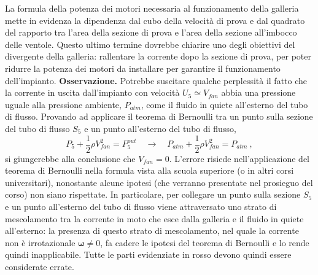 La formula della potenza dei motori necessaria al funzionamento della galleria mette in evidenza la dipendenza dal cubo della velocità di prova e dal quadrato del rapporto tra l'area della sezione di prova e l'area della sezione all'imbocco delle ventole. Questo ultimo termine dovrebbe chiarire uno degli obiettivi del divergente della galleria: rallentare la corrente dopo la sezione di prova, per poter ridurre la potenza dei motori da installare per garantire il funzionamento dell'impianto.
%
\newline \noindent
\textbf{Osservazione.} Potrebbe suscitare qualche perplessità il fatto che la corrente in uscita dall'impianto con velocità $U_5 \simeq V_{fan}$ abbia una pressione uguale alla pressione ambiente, $P_{atm}$, come il fluido in quiete all'esterno del tubo di flusso. {\color{red} Provando ad applicare il teorema di Bernoulli} tra un punto sulla sezione del tubo di flusso $S_5$ e un punto all'esterno del tubo di flusso,
{\color{red}
\begin{equation}
 P_5 + \dfrac{1}{2}\rho V_{fan}^2 = P_5^{out}
 \quad \rightarrow \quad 
 P_{atm} + \dfrac{1}{2}\rho V_{fan}^2 = P_{atm} \ ,
\end{equation}
}
si giungerebbe alla conclusione che {\color{red} $V_{fan} = 0$}. L'errore risiede nell'applicazione del teorema di Bernoulli nella formula vista alla scuola superiore (o in altri corsi universitari), nonostante alcune ipotesi (che verranno presentate nel prosieguo del corso) non siano rispettate. In particolare, per collegare un punto sulla sezione $S_5$ e un punto all'esterno del tubo di flusso viene attraversato uno strato di mescolamento tra la corrente in moto che esce dalla galleria e il fluido in quiete all'esterno: la presenza di questo strato di mescolamento, nel quale la corrente non è irrotazionale $\bm{\omega} \neq 0$, fa cadere le ipotesi del teorema di Bernoulli e lo rende quindi inapplicabile. Tutte {\color{red} le parti evidenziate in rosso devono quindi essere considerate errate}.
